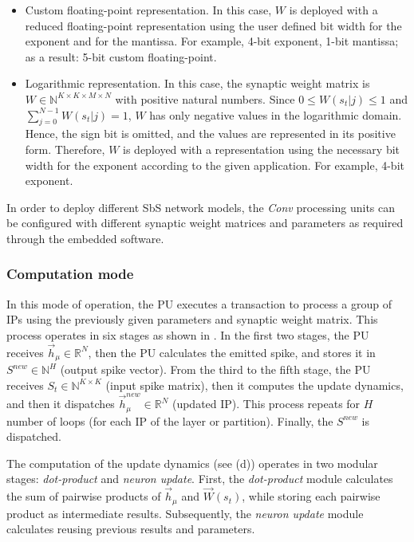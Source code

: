 \begin{itemize}
	\item{Custom floating-point representation}.
	In this case, $W$ is deployed with a reduced floating-point representation using the user defined bit width for the exponent and for the mantissa. For example, 4-bit exponent, 1-bit mantissa; as a result: 5-bit custom floating-point.
	\item{Logarithmic representation}.
	In this case, the synaptic weight matrix is $W\in\mathbb{N}^{K\times K\times M\times N}$ with positive natural numbers. Since $0\le W(s_t|j)\le1$ and $\sum_{j=0}^{N-1}W(s_t|j)=1$, $W$ has only negative values in the logarithmic domain. Hence, the sign bit is omitted, and the values are represented in its positive form. Therefore, $W$ is deployed with a representation using the necessary bit width for the exponent according to the given application. For example, 4-bit exponent.
\end{itemize}

In order to deploy different SbS network models, the \emph{Conv} processing units can be configured with different synaptic weight matrices and parameters as required through the embedded software.

\subsubsection{Computation mode}
In this mode of operation, the PU executes a transaction to process a group of IPs using the previously given parameters and synaptic weight matrix. This process operates in six stages as shown in . In the first two stages, the PU receives $\vec{h}_\mu\in\mathbb{R}^{N}$, then the PU calculates the emitted spike, and stores it in $S^{new}\in\mathbb{N}^{H}$ (output spike vector). From the third to the fifth stage, the PU receives $S_t\in\mathbb{N}^{K\times K}$ (input spike matrix), then it computes the update dynamics, and then it dispatches $\vec{h}_\mu^{new}\in\mathbb{R}^{N}$ (updated IP). This process repeats for $H$ number of loops (for each IP of the layer or partition). Finally, the $S^{new}$ is dispatched.

The computation of the update dynamics (see (d)) operates in two modular stages: \emph{dot-product} and \emph{neuron update}. First, the \emph{dot-product} module calculates the sum of pairwise products of $\vec{h}_{\mu}$ and $\vec{W}(s_t)$, while storing each pairwise product as intermediate results. Subsequently, the \emph{neuron update} module calculates  reusing previous results and parameters.



